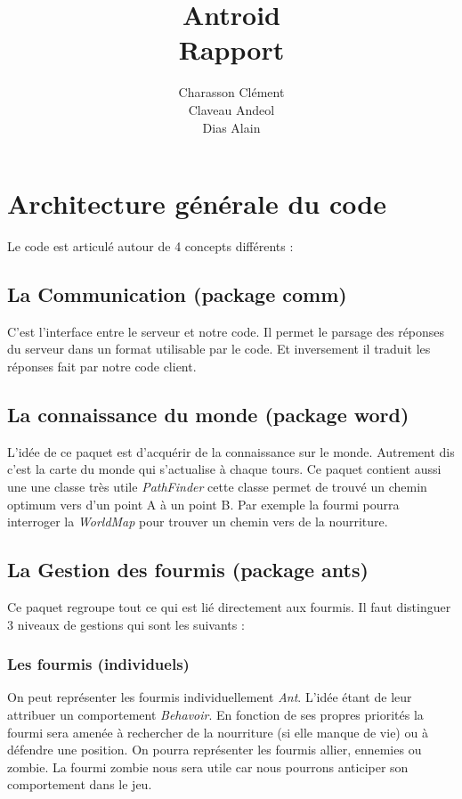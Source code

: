 \documentclass[11pt,a4paper]{article}
\title{\huge \textbf {Antroid \\Rapport}}
\author{Charasson Clément \\ Claveau Andeol \\ Dias Alain}
\begin{document}
\maketitle
\section{Architecture générale du code}

Le code est articulé autour de 4 concepts différents :

\subsection{La Communication  (package comm)}
C'est l'interface entre le serveur et notre code. Il permet le parsage des réponses du serveur dans un format utilisable par le code. Et inversement il traduit les réponses fait par notre code client.

\subsection{La connaissance du monde (package word)}
L'idée de ce paquet est d’acquérir de la connaissance sur le monde. Autrement dis c'est la carte du monde qui s'actualise à chaque tours. Ce paquet contient aussi une une classe très utile \emph{PathFinder} cette classe permet de trouvé un chemin optimum vers d'un point A à un point B. Par exemple la fourmi pourra interroger la \emph{WorldMap} pour trouver un chemin vers de la nourriture.

\subsection{La Gestion des fourmis (package ants)}
Ce paquet regroupe tout ce qui est lié directement aux fourmis. Il faut distinguer 3 niveaux de gestions qui sont les suivants :

\subsubsection{Les fourmis (individuels)}
On peut représenter les fourmis individuellement \emph{Ant}. L'idée étant de leur attribuer un comportement \emph{Behavoir}. En fonction de ses propres priorités la fourmi sera amenée à rechercher de la nourriture (si elle manque de vie) ou à défendre une position. On pourra représenter les fourmis allier, ennemies ou zombie. La fourmi zombie nous sera utile car nous pourrons anticiper son comportement dans le jeu.
\end{document}
